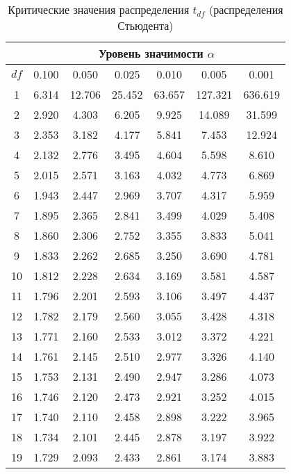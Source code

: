 \documentclass[12pt]{article}
\begin{document}
\begin{table}
\caption{Критические значения распределения $t_{df}$ (распределения
Стьюдента)}
\begin{center}
{\footnotesize
\begin{tabular}{|c|c|c|c|c|c|c|}
  \hline
   & \multicolumn{6}{c|}{Уровень значимости $\alpha$} \\ \hline
    $df$  & 0.100 &  0.050 &  0.025 &  0.010 &  0.005 &  0.001\\ \hline
     1 &  6.314 &  12.706 & 25.452 & 63.657 & 127.321& 636.619\\
     2 &  2.920 &  4.303 &  6.205 &  9.925 &  14.089 & 31.599\\
     3 &  2.353 &  3.182 &  4.177 &  5.841 &  7.453 &  12.924\\
     4 &  2.132 &  2.776 &  3.495 &  4.604 &  5.598 &  8.610\\
     5 &  2.015 &  2.571& 3.163 &  4.032 &  4.773 &  6.869\\
     6 &  1.943 &  2.447 &  2.969 &  3.707 &  4.317&   5.959\\
     7  & 1.895 &  2.365 &  2.841 &  3.499 &  4.029 &  5.408 \\
     8  & 1.860 &  2.306&2.752 &  3.355 &  3.833 &  5.041\\
     9 &  1.833 &  2.262 &  2.685 &  3.250 &  3.690 &  4.781\\
    10 & 1.812 &  2.228 &  2.634 &  3.169 &  3.581 &  4.587 \\
    11 & 1.796 &  2.201&2.593 &  3.106 &  3.497 &  4.437\\
    12 & 1.782 &  2.179 &  2.560 &  3.055 &  3.428 &  4.318\\
13 & 1.771 &  2.160 &  2.533 &  3.012 &  3.372 &  4.221\\
 14 & 1.761&2.145 &2.510 &  2.977 &  3.326 &  4.140\\
  15 & 1.753 &  2.131 &  2.490& 2.947&3.286 &4.073 \\
  16 & 1.746 &  2.120 &  2.473 &  2.921 &  3.252& 4.015\\
   17 &1.740&2.110 &2.458 &  2.898 &  3.222 &  3.965 \\
   18  &1.734 &2.101 &2.445 &  2.878& 3.197& 3.922 \\
   19 & 1.729 &  2.093 &  2.433& 2.861& 3.174&   3.883 \\

\end{tabular}}
\end{center}
\end{table}
\end{document}
